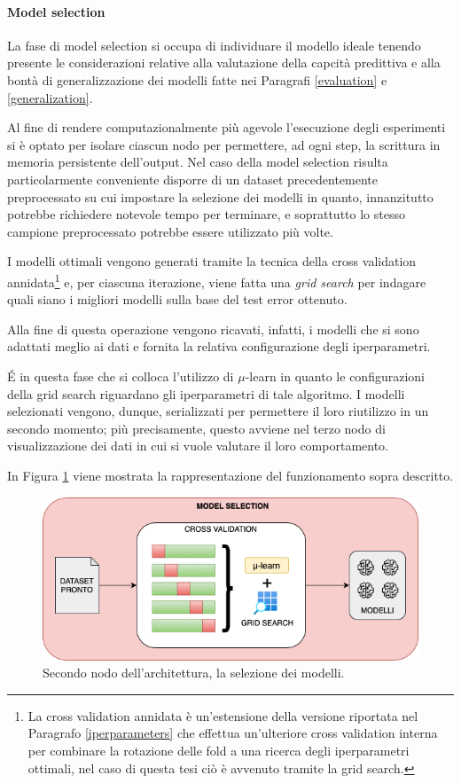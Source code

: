 \documentclass[12pt]{report}
\theoremstyle{definition}
\begin{document}
\paragraph{Model selection}
La fase di model selection si occupa di individuare il modello ideale tenendo presente le considerazioni relative alla valutazione della capcità predittiva e alla bontà di generalizzazione dei modelli fatte nei Paragrafi \ref{evaluation} e \ref{generalization}.

Al fine di rendere computazionalmente più agevole l'esecuzione degli esperimenti si è optato per isolare ciascun nodo per permettere, ad ogni step, la scrittura in memoria persistente dell'output. Nel caso della model selection risulta particolarmente conveniente disporre di un dataset precedentemente preprocessato su cui impostare la selezione dei modelli in quanto, innanzitutto potrebbe richiedere notevole tempo per terminare, e soprattutto lo stesso campione preprocessato potrebbe essere utilizzato più volte.

I modelli ottimali vengono generati tramite la tecnica della cross validation annidata\footnote{La cross validation annidata è un'estensione della versione riportata nel Paragrafo \ref{iperparameters} che effettua un'ulteriore cross validation interna per combinare la rotazione delle fold a una ricerca degli iperparametri ottimali, nel caso di questa tesi ciò è avvenuto tramite la grid search.} e, per ciascuna iterazione, viene fatta una \textit{grid search} per indagare quali siano i migliori modelli sulla base del test error ottenuto.

Alla fine di questa operazione vengono ricavati, infatti, i modelli che si sono adattati meglio ai dati e fornita la relativa configurazione degli iperparametri.

\'E in questa fase che si colloca l'utilizzo di $\mu$-learn in quanto le configurazioni della grid search riguardano gli iperparametri di tale algoritmo.
I modelli selezionati vengono, dunque, serializzati per permettere il loro riutilizzo in un secondo momento; più precisamente, questo avviene nel terzo nodo di visualizzazione dei dati in cui si vuole valutare il loro comportamento.

In Figura \ref{selectionmodel} viene mostrata la rappresentazione del funzionamento sopra descritto.
\begin{figure}
    \centering
    \includegraphics[scale=0.6]{images/modelselectionmodule.png}
    \caption{Secondo nodo dell'architettura, la selezione dei modelli.}
    \label{selectionmodel}
\end{figure}
\end{document}
